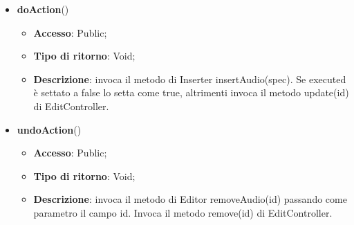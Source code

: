 {{{\begin{itemize}
		\begin{itemize}
			\item \textbf{Accesso}: Public;
			\item \textbf{Tipo di ritorno}: Void;
			\item \textbf{Descrizione}: costruisce l’oggetto ConcreteAudioInsertCommand.
		\end{itemize}
		\item \textbf{doAction}()
		\begin{itemize}
			\item \textbf{Accesso}: Public;
			\item \textbf{Tipo di ritorno}: Void;
			\item \textbf{Descrizione}: invoca il metodo di Inserter insertAudio(spec). Se executed è settato a false lo setta come true, altrimenti invoca il metodo update(id) di EditController.
		\end{itemize}
		\item \textbf{undoAction}()
		\begin{itemize}
			\item \textbf{Accesso}: Public;
			\item \textbf{Tipo di ritorno}: Void;
			\item \textbf{Descrizione}: invoca il metodo di Editor removeAudio(id) passando come parametro il campo id. Invoca il metodo remove(id) di EditController.
		\end{itemize}
	\end{itemize}
	}
}}
